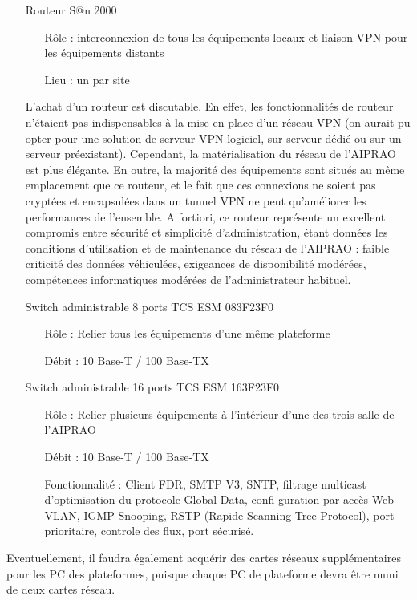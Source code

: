 \el
\begin{itemize}
\item[Routeur S@n 2000]\
\begin{itemize}
\item[Rôle]: interconnexion de tous les équipements locaux et liaison VPN pour
    les équipements distants
\item[Lieu]: un par site
\end{itemize}


	L'achat d'un routeur est discutable. En effet, les fonctionnalités
de routeur n'étaient pas indispensables à la mise en place d'un réseau
VPN (on aurait pu opter pour une solution de serveur VPN logiciel, sur
serveur dédié ou sur un serveur préexistant).
	Cependant, la matérialisation du réseau de l'AIPRAO est plus élégante.
En outre, la majorité des équipements sont situés au même emplacement que
ce routeur, et le fait que ces connexions ne soient pas cryptées et encapsulées
dans un tunnel VPN ne peut qu'améliorer les performances de l'ensemble.
	A fortiori, ce routeur représente un excellent compromis entre sécurité et
simplicité d'administration, étant données les conditions d'utilisation et de
maintenance du réseau de l'AIPRAO : faible criticité des données véhiculées,
exigeances de disponibilité modérées, compétences informatiques modérées de
l'administrateur habituel.

\el
\item[Switch administrable 8 ports TCS ESM 083F23F0]\el
\begin{itemize}
\item[Rôle] : Relier tous les équipements d'une même plateforme
\item[Débit] : 10 Base-T / 100 Base-TX
\end{itemize}
\el

\item[Switch administrable 16 ports TCS ESM 163F23F0]\el
\begin{itemize}
\item[Rôle] : Relier plusieurs équipements à l'intérieur d'une des
    trois salle de l'AIPRAO
\item[Débit] : 10 Base-T / 100 Base-TX
\item[Fonctionnalité]: Client FDR, SMTP V3, SNTP, filtrage multicast d’optimisation du
protocole Global Data, confi guration par accès Web VLAN, IGMP Snooping,
RSTP (Rapide Scanning Tree Protocol), port prioritaire, controle des flux,
port sécurisé.
\end{itemize}

\end{itemize}
Eventuellement, il faudra également acquérir des cartes réseaux supplémentaires
pour les PC des plateformes, puisque chaque PC de plateforme devra être muni de
deux cartes réseau.

